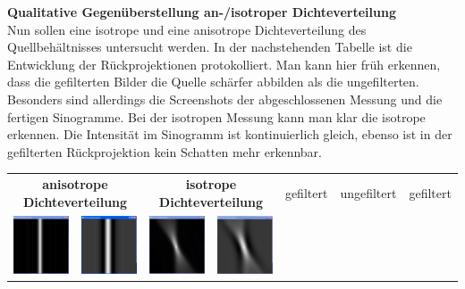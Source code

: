         \textbf{Qualitative Gegenüberstellung an-/isotroper Dichteverteilung}\\
        Nun sollen eine isotrope und eine anisotrope Dichteverteilung des Quellbehältnisses untersucht werden. In der nachstehenden Tabelle ist die Entwicklung der Rückprojektionen
        protokolliert. Man kann hier früh erkennen, dass die gefilterten Bilder die Quelle schärfer abbilden als die ungefilterten. Besonders sind allerdings die Screenshots 
        der abgeschlossenen Messung und  die fertigen Sinogramme. Bei der isotropen Messung kann man klar die isotrope erkennen. Die Intensität im Sinogramm ist kontinuierlich gleich,
        ebenso ist in der gefilterten Rückprojektion kein Schatten mehr erkennbar. 
 
              \begin{longtable}{p{3cm}p{3cm}p{3cm}p{3cm}c} 
                  \multicolumn{2}{c}{\textbf{anisotrope Dichteverteilung}} & \multicolumn{2}{c}{\textbf{isotrope Dichteverteilung}}\endhead
                  ungefiltert & gefiltert & ungefiltert & gefiltert\\
                  \includegraphics[width=.2\textwidth, height=0.125\textheight]{pic/Einzelfenster_Bilder/inhomogene_Messung/inhomo1einf_prj.png}
                  & 
                  \includegraphics[width=.2\textwidth, height=0.125\textheight]{pic/Einzelfenster_Bilder/inhomogene_Messung/inhomo1gef_prj.png}
                  &
                  \includegraphics[width=.2\textwidth, height=0.125\textheight]{pic/Einzelfenster_Bilder/isotrope_Messung/iso1einf_rueckprj.png}
                  & 
                  \includegraphics[width=.2\textwidth, height=0.125\textheight]{pic/Einzelfenster_Bilder/isotrope_Messung/iso1gef_prj.png}\\

\end{longtable}

